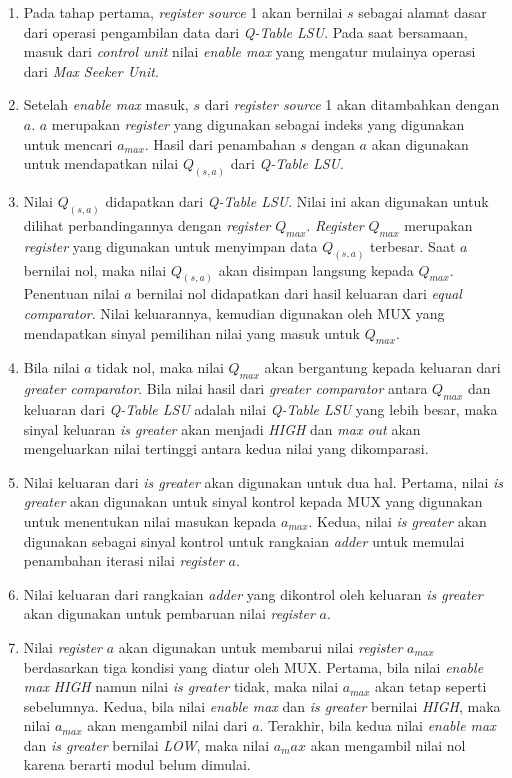 \begin{enumerate}
	\item Pada tahap pertama, \textit{register source} 1 akan bernilai $s$ sebagai alamat dasar dari operasi pengambilan data dari \textit{Q-Table \ac{LSU}}. Pada saat bersamaan, masuk dari \textit{control unit} nilai \textit{enable max} yang mengatur mulainya operasi dari \textit{Max Seeker Unit}.
	\item Setelah \textit{enable max} masuk, $s$ dari \textit{register source} 1 akan ditambahkan dengan $a$. $a$ merupakan \textit{register} yang digunakan sebagai indeks yang digunakan untuk mencari $a_{max}$. Hasil dari penambahan $s$ dengan $a$ akan digunakan untuk mendapatkan nilai $Q_{(s,a)}$ dari \textit{Q-Table \ac{LSU}}.
	\item Nilai $Q_{(s,a)}$ didapatkan dari \textit{Q-Table \ac{LSU}}. Nilai ini akan digunakan untuk dilihat perbandingannya dengan \textit{register} $Q_{max}$. \textit{Register} $Q_{max}$ merupakan \textit{register} yang digunakan untuk menyimpan data $Q_{(s,a)}$ terbesar. Saat $a$ bernilai nol, maka nilai $Q_{(s,a)}$ akan disimpan langsung kepada $Q_{max}$. Penentuan nilai $a$ bernilai nol didapatkan dari hasil keluaran dari \textit{equal comparator}. Nilai keluarannya, kemudian digunakan oleh \ac{MUX} yang mendapatkan sinyal pemilihan nilai yang masuk untuk $Q_{max}$. \label{listline:max-seeker-start}
	\item Bila nilai $a$ tidak nol, maka nilai $Q_{max}$ akan bergantung kepada keluaran dari \textit{greater comparator}. Bila nilai hasil dari \textit{greater comparator} antara $Q_{max}$ dan keluaran dari \textit{Q-Table \ac{LSU}} adalah nilai \textit{Q-Table \ac{LSU}} yang lebih besar, maka sinyal keluaran \textit{is greater} akan menjadi \textit{HIGH} dan \textit{max out} akan mengeluarkan nilai tertinggi antara kedua nilai yang dikomparasi.
	\item Nilai keluaran dari \textit{is greater} akan digunakan untuk dua hal. Pertama, nilai \textit{is greater} akan digunakan untuk sinyal kontrol kepada \ac{MUX} yang digunakan untuk menentukan nilai masukan kepada $a_{max}$. Kedua, nilai \textit{is greater} akan digunakan sebagai sinyal kontrol untuk rangkaian \textit{adder} untuk memulai penambahan iterasi nilai \textit{register} $a$.
	\item Nilai keluaran dari rangkaian \textit{adder} yang dikontrol oleh keluaran \textit{is greater} akan digunakan untuk pembaruan nilai \textit{register} $a$.
	\item Nilai \textit{register} $a$ akan digunakan untuk membarui nilai \textit{register} $a_{max}$ berdasarkan tiga kondisi yang diatur oleh \ac{MUX}. Pertama, bila nilai \textit{enable max} \textit{HIGH} namun nilai \textit{is greater} tidak, maka nilai $a_{max}$ akan tetap seperti sebelumnya. Kedua, bila nilai \textit{enable max} dan \textit{is greater} bernilai \textit{HIGH}, maka nilai $a_{max}$ akan mengambil nilai dari $a$. Terakhir, bila kedua nilai \textit{enable max} dan \textit{is greater} bernilai \textit{LOW}, maka nilai $a_max$ akan mengambil nilai nol karena berarti modul belum dimulai. \label{listline:max-seeker-end}
\end{enumerate}

